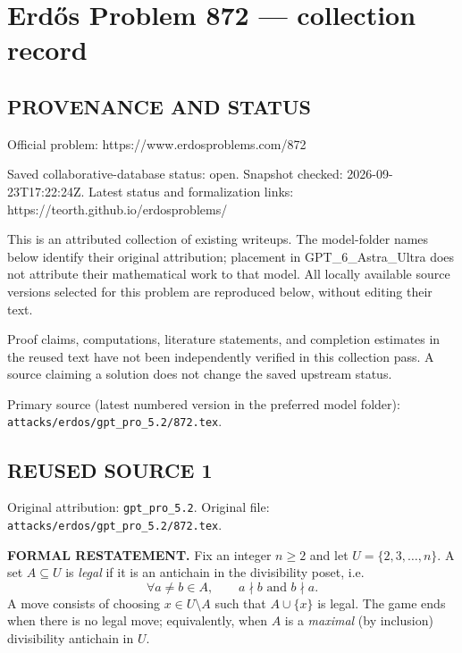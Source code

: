 \section*{Erd\H{o}s Problem 872 --- collection record}

\subsection*{PROVENANCE AND STATUS}
Official problem: https://www.erdosproblems.com/872

Saved collaborative-database status: open.
Snapshot checked: 2026-09-23T17:22:24Z.
Latest status and formalization links: https://teorth.github.io/erdosproblems/

This is an attributed collection of existing writeups. The model-folder names below identify their original attribution; placement in GPT\_6\_Astra\_Ultra does not attribute their mathematical work to that model. All locally available source versions selected for this problem are reproduced below, without editing their text.

Proof claims, computations, literature statements, and completion estimates in the reused text have not been independently verified in this collection pass. A source claiming a solution does not change the saved upstream status.

Primary source (latest numbered version in the preferred model folder): \texttt{attacks/erdos/gpt\_pro\_5.2/872.tex}.

\subsection*{REUSED SOURCE 1}
Original attribution: \texttt{gpt\_pro\_5.2}.
Original file: \texttt{attacks/erdos/gpt\_pro\_5.2/872.tex}.


\noindent\textbf{FORMAL RESTATEMENT.}
Fix an integer $n\ge 2$ and let $U=\{2,3,\dots,n\}$.
A set $A\subseteq U$ is \emph{legal} if it is an antichain in the divisibility poset, i.e.
\[
\forall a\neq b\in A,\qquad a\nmid b\text{ and }b\nmid a.
\]
A move consists of choosing $x\in U\setminus A$ such that $A\cup\{x\}$ is legal.
The game ends when there is no legal move; equivalently, when $A$ is a \emph{maximal} (by inclusion) divisibility antichain in $U$.

